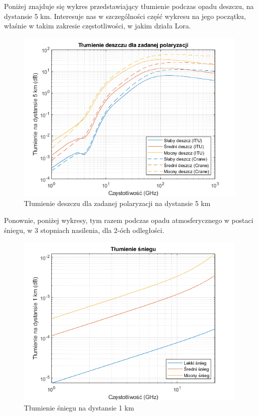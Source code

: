 Poniżej znajduje się wykres przedstawiający tłumienie podczas opadu deszczu, na dystansie 5 km. Interesuje nas w szczególności część wykresu na jego początku, właśnie w takim zakresie częstotliwości, w jakim działa Lora.
\begin{figure}[h!]
	\label{fig2}
	\includegraphics{./grafika/num_sim2_tlumienie_podczas_opadu_deszczu.png}
	\caption{Tłumienie deszczu dla zadanej polaryzacji na dystansie 5 km}
\end{figure}

Ponownie, poniżej wykresy, tym razem podczas opadu atmosferycznego w postaci śniegu, w 3 stopniach nasilenia, dla 2-óch odległości.
\begin{figure}[h!]
	\label{fig3}
	\includegraphics{./grafika/num_sim3_tlumienie_podczas_opadu_sniegu_1km.png}
	\caption{Tłumienie śniegu na dystansie 1 km}
\end{figure}

